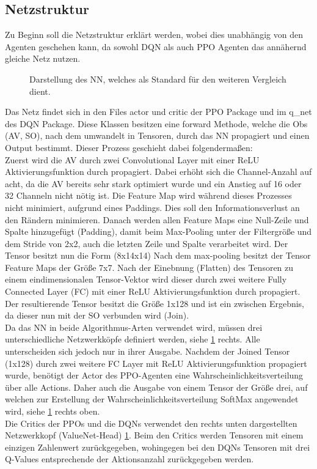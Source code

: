 \subsection{Netzstruktur} \label{sec:Impl_Netzstruktur}
Zu Beginn soll die Netzstruktur erklärt werden, wobei dies unabhängig von den Agenten geschehen kann, da sowohl DQN als auch PPO Agenten das annähernd gleiche Netz nutzen.
\begin{figure}[H]
	\centering
	\def\svgscale{0.80}
	
	\caption[BaseNet]{Darstellung des NN, welches als Standard für den weiteren Vergleich dient.}
	\label{fig:Netzsturktur}
\end{figure}
Das Netz findet sich in den Files actor und critic der PPO Package und im q\_net des DQN Package. 
Diese Klassen besitzen eine forward Methode, welche die Obs (AV, SO), nach dem umwandelt in Tensoren, durch das NN propagiert und einen Output bestimmt. Dieser Prozess geschieht dabei folgendermaßen:\\
Zuerst wird die AV durch zwei Convolutional Layer mit einer ReLU Aktivierungsfunktion durch propagiert. Dabei erhöht sich die Channel-Anzahl auf acht, da die AV bereits sehr stark optimiert wurde und ein Anstieg auf 16 oder 32 Channeln nicht nötig ist. Die Feature Map wird während dieses Prozesses nicht minimiert, aufgrund eines Paddings. Dies soll den Informationsverlust an den Rändern minimieren.  
Danach werden allen Feature Maps eine Null-Zeile und Spalte hinzugefügt (Padding), damit beim Max-Pooling unter der Filtergröße und dem Stride von 2x2, auch die letzten Zeile und Spalte verarbeitet wird. Der Tensor besitzt nun die Form (8x14x14) 
Nach dem max-pooling besitzt der Tensor Feature Maps der Größe 7x7. Nach der Einebnung (Flatten) des Tensoren zu einem eindimensionalen Tensor-Vektor wird dieser durch zwei weitere Fully Connected Layer (FC) mit einer ReLU Aktivierungsfunktion durch propagiert. Der resultierende Tensor besitzt die Größe 1x128 und ist ein zwischen Ergebnis, da dieser nun mit der SO verbunden wird (Join).\\
Da das NN in beide Algorithmus-Arten verwendet wird, müssen drei unterschiedliche Netzwerkköpfe definiert werden, siehe \ref{fig:Netzsturktur} rechts. Alle unterscheiden sich jedoch nur in ihrer Ausgabe. Nachdem der Joined Tensor (1x128) durch zwei weitere FC Layer mit ReLU Aktivierungsfunktion propagiert wurde, benötigt der Actor des PPO-Agenten eine Wahrscheinlichkeitsverteilung über alle Actions. Daher auch die Ausgabe von einem Tensor der Größe drei, auf welchen zur Erstellung der Wahrscheinlichkeitsverteilung SoftMax angewendet wird, siehe \ref{fig:Netzsturktur} rechts oben.\\
Die Critics der PPOs und die DQNs verwendet den rechts unten dargestellten Netzwerkkopf (ValueNet-Head) \ref{fig:Netzsturktur}. Beim den Critics werden Tensoren mit einem einzigen Zahlenwert zurückgegeben, wohingegen bei den DQNs Tensoren mit drei Q-Values entsprechende der Aktionsanzahl zurückgegeben werden.


